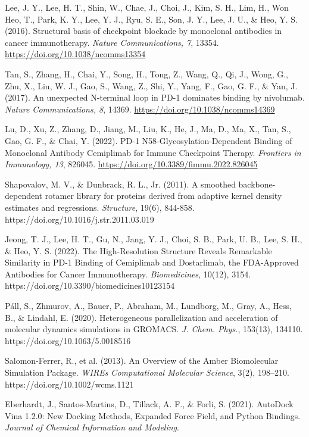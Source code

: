 \documentclass[11pt]{article}
\begin{document}
\begin{thebibliography}{99}
 Lee, J. Y., Lee, H. T., Shin, W., Chae, J., Choi, J., Kim, S. H., Lim, H., Won Heo, T., Park, K. Y., Lee, Y. J., Ryu, S. E., Son, J. Y., Lee, J. U., \& Heo, Y. S. (2016). Structural basis of checkpoint blockade by monoclonal antibodies in cancer immunotherapy. \textit{Nature Communications, 7}, 13354. \url{https://doi.org/10.1038/ncomms13354}

 Tan, S., Zhang, H., Chai, Y., Song, H., Tong, Z., Wang, Q., Qi, J., Wong, G., Zhu, X., Liu, W. J., Gao, S., Wang, Z., Shi, Y., Yang, F., Gao, G. F., \& Yan, J. (2017). An unexpected N-terminal loop in PD-1 dominates binding by nivolumab. \textit{Nature Communications, 8}, 14369. \url{https://doi.org/10.1038/ncomms14369}

 Lu, D., Xu, Z., Zhang, D., Jiang, M., Liu, K., He, J., Ma, D., Ma, X., Tan, S., Gao, G. F., \& Chai, Y. (2022). PD-1 N58-Glycosylation-Dependent Binding of Monoclonal Antibody Cemiplimab for Immune Checkpoint Therapy. \textit{Frontiers in Immunology, 13}, 826045. \url{https://doi.org/10.3389/fimmu.2022.826045}

 Shapovalov, M. V., \& Dunbrack, R. L., Jr. (2011). A smoothed backbone-dependent rotamer library for proteins derived from adaptive kernel density estimates and regressions. \textit{Structure}, 19(6), 844-858. https://doi.org/10.1016/j.str.2011.03.019

 Jeong, T. J., Lee, H. T., Gu, N., Jang, Y. J., Choi, S. B., Park, U. B., Lee, S. H., \& Heo, Y. S. (2022). The High-Resolution Structure Reveals Remarkable Similarity in PD-1 Binding of Cemiplimab and Dostarlimab, the FDA-Approved Antibodies for Cancer Immunotherapy. \textit{Biomedicines}, 10(12), 3154. https://doi.org/10.3390/biomedicines10123154

 Páll, S., Zhmurov, A., Bauer, P., Abraham, M., Lundborg, M., Gray, A., Hess, B., \& Lindahl, E. (2020). Heterogeneous parallelization and acceleration of molecular dynamics simulations in GROMACS. \textit{J. Chem. Phys.}, 153(13), 134110. https://doi.org/10.1063/5.0018516

 Salomon-Ferrer, R., et al. (2013). An Overview of the Amber Biomolecular Simulation Package. \textit{WIREs Computational Molecular Science}, 3(2), 198–210. https://doi.org/10.1002/wcms.1121

 Eberhardt, J., Santos-Martins, D., Tillack, A. F., \& Forli, S. (2021). AutoDock Vina 1.2.0: New Docking Methods, Expanded Force Field, and Python Bindings. \textit{Journal of Chemical Information and Modeling}.


\end{thebibliography}
\end{document}
